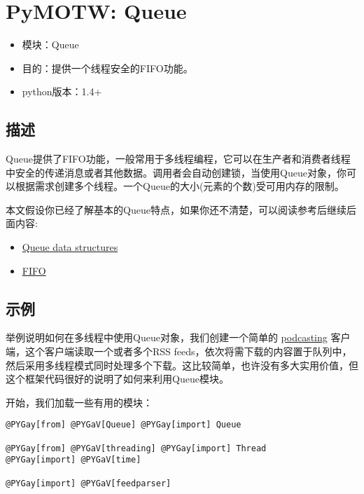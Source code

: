 \documentclass[a4paper,10pt,english]{manual}
\begin{document}
\resetcurrentobjects


\section{PyMOTW: Queue}
\begin{itemize}
\item {} 
模块：Queue

\item {} 
目的：提供一个线程安全的FIFO功能。

\item {} 
python版本：1.4+

\end{itemize}


\subsection{描述}

Queue提供了FIFO功能，一般常用于多线程编程，它可以在生产者和消费者线程中安全的传递消息或者其他数据。调用者会自动创建锁，当使用Queue对象，你可以根据需求创建多个线程。一个Queue的大小(元素的个数)受可用内存的限制。

本文假设你已经了解基本的Queue特点，如果你还不清楚，可以阅读参考后继续后面内容:
\begin{itemize}
\item {} 
\href{http://en.wikipedia.org/wiki/Queue\_\%28data\_structure}{Queue data structures}

\item {} 
\href{http://en.wikipedia.org/wiki/FIFO}{FIFO}

\end{itemize}


\subsection{示例}

举例说明如何在多线程中使用Queue对象，我们创建一个简单的 \href{http://en.wikipedia.org/wiki/Podcasting}{podcasting} 客户端，这个客户端读取一个或者多个RSS feeds，依次将需下载的内容置于队列中，然后采用多线程模式同时处理多个下载。这比较简单，也许没有多大实用价值，但这个框架代码很好的说明了如何来利用Queue模块。

开始，我们加载一些有用的模块：

\begin{Verbatim}[commandchars=@\[\]]
@PYGay[from] @PYGaV[Queue] @PYGay[import] Queue

@PYGay[from] @PYGaV[threading] @PYGay[import] Thread
@PYGay[import] @PYGaV[time]

@PYGay[import] @PYGaV[feedparser]
\end{Verbatim}
\end{document}
